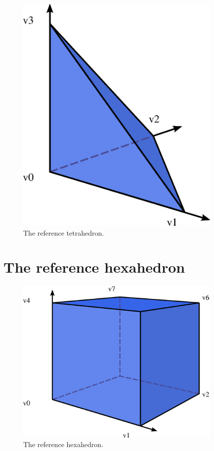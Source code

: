 \begin{figure}[H]
  \begin{center}
    \includegraphics[width=10cm]{eps/tetrahedron.eps}
    \caption{The reference tetrahedron.}
  \end{center}
\end{figure}

\newpage
\section{The reference hexahedron}

\begin{figure}[H]
  \begin{center}
    \includegraphics[width=10cm]{eps/hexahedron.eps}
    \caption{The reference hexahedron.}
  \end{center}
\end{figure}
